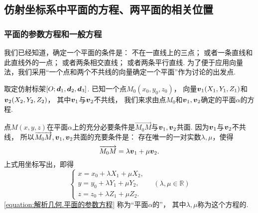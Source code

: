 \subsection{仿射坐标系中平面的方程、两平面的相关位置}
\subsubsection{平面的参数方程和一般方程}
我们已经知道，确定一个平面的条件是：
不在一直线上的三点；
或者一条直线和此直线外的一点；
或者两条相交直线；
或者两条平行直线.
为了便于应用向量法，我们采用“一个点和两个不共线的向量确定一个平面”作为讨论的出发点.

取定仿射标架\([O;\boldsymbol{d}_1,\boldsymbol{d}_2,\boldsymbol{d}_3]\).
已知一个点\(M_0(x_0,y_0,z_0)\)，
向量\(\boldsymbol{v}_1(X_1,Y_1,Z_1)\)和\(\boldsymbol{v}_2(X_2,Y_2,Z_2)\)，
其中\(\boldsymbol{v}_1\)与\(\boldsymbol{v}_2\)不共线，
我们来求由点\(M_0\)和\(\boldsymbol{v}_1,\boldsymbol{v}_2\)确定的平面\(\alpha\)的方程.

点\(M(x,y,z)\)在平面\(\alpha\)上的充分必要条件是\(\vec{M_0 M}\)与\(\boldsymbol{v}_1,\boldsymbol{v}_2\)共面.
因为\(\boldsymbol{v}_1\)与\(\boldsymbol{v}_2\)不共线，
所以\(\overrightarrow{M_0 M},\boldsymbol{v}_1,\boldsymbol{v}_2\)共面的充要条件是：
存在唯一的一对实数\(\lambda,\mu\)，使得\[
	\overrightarrow{M_0 M} = \lambda \boldsymbol{v}_1 + \mu \boldsymbol{v}_2.
\]
上式用坐标写出，即得
\begin{equation}\label{equation:解析几何.平面的参数方程}
	\left\{ \begin{array}{l}
		x = x_0 + \lambda X_1 + \mu X_2, \\
		y = y_0 + \lambda Y_1 + \mu Y_2, \\
		z = z_0 + \lambda Z_1 + \mu Z_2.
	\end{array} \right.
	\quad(\lambda,\mu\in\mathbb{R})
\end{equation}
\cref{equation:解析几何.平面的参数方程}
称为“平面\(\alpha\)的”，
其中\(\lambda,\mu\)称为这个方程的.

